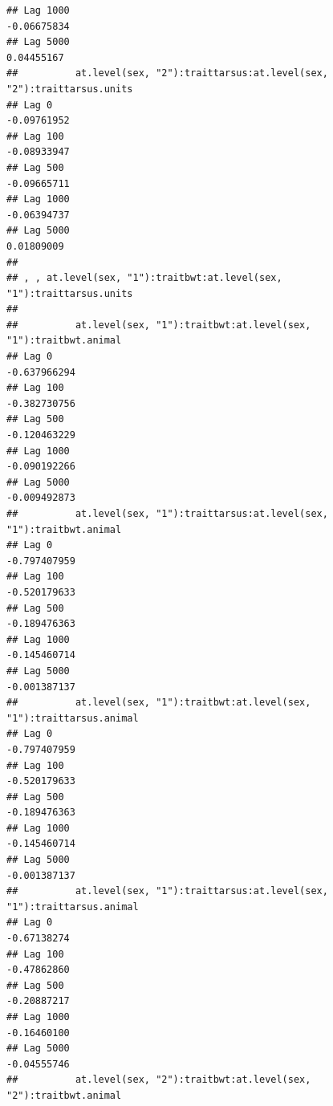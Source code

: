 \documentclass[
  12pt,
]{book}
\begin{document}
\begin{verbatim}
## Lag 1000                                                      -0.06675834
## Lag 5000                                                       0.04455167
##          at.level(sex, "2"):traittarsus:at.level(sex, "2"):traittarsus.units
## Lag 0                                                            -0.09761952
## Lag 100                                                          -0.08933947
## Lag 500                                                          -0.09665711
## Lag 1000                                                         -0.06394737
## Lag 5000                                                          0.01809009
## 
## , , at.level(sex, "1"):traitbwt:at.level(sex, "1"):traittarsus.units
## 
##          at.level(sex, "1"):traitbwt:at.level(sex, "1"):traitbwt.animal
## Lag 0                                                      -0.637966294
## Lag 100                                                    -0.382730756
## Lag 500                                                    -0.120463229
## Lag 1000                                                   -0.090192266
## Lag 5000                                                   -0.009492873
##          at.level(sex, "1"):traittarsus:at.level(sex, "1"):traitbwt.animal
## Lag 0                                                         -0.797407959
## Lag 100                                                       -0.520179633
## Lag 500                                                       -0.189476363
## Lag 1000                                                      -0.145460714
## Lag 5000                                                      -0.001387137
##          at.level(sex, "1"):traitbwt:at.level(sex, "1"):traittarsus.animal
## Lag 0                                                         -0.797407959
## Lag 100                                                       -0.520179633
## Lag 500                                                       -0.189476363
## Lag 1000                                                      -0.145460714
## Lag 5000                                                      -0.001387137
##          at.level(sex, "1"):traittarsus:at.level(sex, "1"):traittarsus.animal
## Lag 0                                                             -0.67138274
## Lag 100                                                           -0.47862860
## Lag 500                                                           -0.20887217
## Lag 1000                                                          -0.16460100
## Lag 5000                                                          -0.04555746
##          at.level(sex, "2"):traitbwt:at.level(sex, "2"):traitbwt.animal

\end{verbatim}
\end{document}
